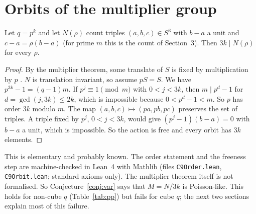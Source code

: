 \section{Orbits of the multiplier group}\label{sec:orb}
\begin{proposition}\label{prop:orb}
Let $q=p^k$ and let $N(\rho)$ count triples $(a,b,c)\in S^3$ with $b-a$ a unit and $c-a=\rho(b-a)$ (for prime $m$ this is the count of Section~3).
Then $3k\mid N(\rho)$ for every $\rho$.
\end{proposition}
\begin{proof}
By the multiplier theorem, some translate of $S$ is fixed by multiplication by $p$ \cite{Ha,MR}. $N$ is translation invariant, so assume $pS=S$.
We have $p^{3k}-1=(q-1)m$. If $p^j\equiv1\pmod m$ with $0<j<3k$, then $m\mid p^d-1$ for $d=\gcd(j,3k)\le 2k$, which is impossible because $0<p^d-1<m$.
So $p$ has order $3k$ modulo $m$. The map $(a,b,c)\mapsto(pa,pb,pc)$ preserves the set of triples. A triple fixed by $p^j$, $0<j<3k$, would give
$(p^j-1)(b-a)=0$ with $b-a$ a unit, which is impossible. So the action is free and every orbit has $3k$ elements.
\end{proof}
This is elementary and probably known. The order statement and the freeness step are machine-checked in Lean~4 with Mathlib
(files \texttt{C9Order.lean}, \texttt{C9Orbit.lean}; standard axioms only). The multiplier theorem itself is not formalised.
So Conjecture~\ref{conj:var} says that $M=N/3k$ is Poisson-like. This holds for non-cube $q$ (Table~\ref{tab:pp}) but fails for cube $q$; the next two sections explain most of this failure.

